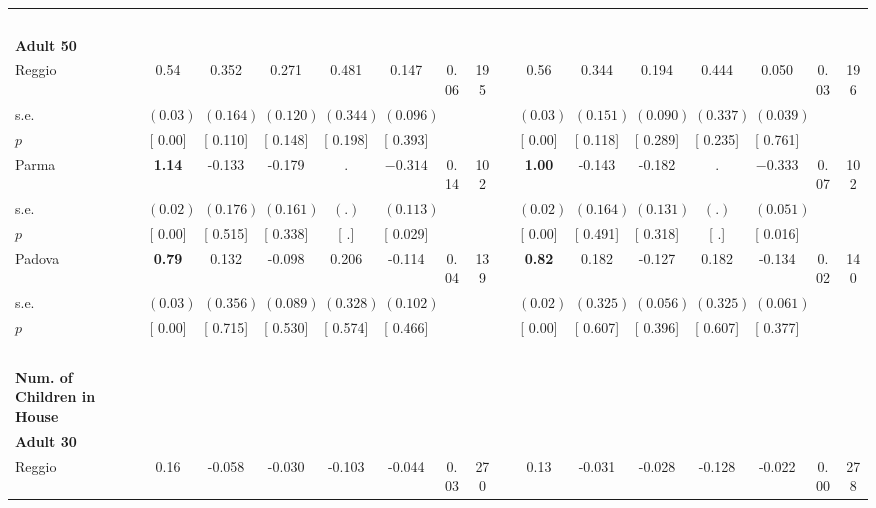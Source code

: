 \begin{longtable}{L{8em} c c c c c c c p{1em} c c c c c c c}
~\\[1em]
\quad \quad \textbf{Adult 50} & & & & & & & & & & & & & & & \\* 
\quad \quad \quad Reggio& 0.54 &     0.352 &     0.271 &     0.481 &     0.147 &      0.06 &       195 & & 0.56 &     0.344 &     0.194 &     0.444 &     0.050 &      0.03 &       196  \\*
\quad \quad \quad \quad s.e.& $ (     0.03)$ & $ (    0.164)$ & $ (    0.120)$ & $ (    0.344)$ & $ (    0.096)$ & & & & $ (     0.03)$ & $ (    0.151)$ & $ (    0.090)$ & $ (    0.337)$ & $ (    0.039)$ & &  \\*
\quad \quad \quad \quad $ p$ & [     0.00] & [    0.110] & [    0.148] & [    0.198] & [    0.393] & & & & [     0.00] & [    0.118] & [    0.289] & [    0.235] & [    0.761] & &  \\[1em]
\quad \quad \quad Parma& \textbf{     1.14} &    -0.133 &    -0.179 &         . & $ \mathbf{   -0.314}$ &      0.14 &       102 & & \textbf{     1.00} &    -0.143 &    -0.182 &         . & $ \mathbf{   -0.333}$ &      0.07 &       102  \\*
\quad \quad \quad \quad s.e.& $ (     0.02)$ & $ (    0.176)$ & $ (    0.161)$ & $ (        .)$ & $ (    0.113)$ & & & & $ (     0.02)$ & $ (    0.164)$ & $ (    0.131)$ & $ (        .)$ & $ (    0.051)$ & &  \\*
\quad \quad \quad \quad $ p$ & [     0.00] & [    0.515] & [    0.338] & [        .] & [    0.029] & & & & [     0.00] & [    0.491] & [    0.318] & [        .] & [    0.016] & &  \\[1em]
\quad \quad \quad Padova& \textbf{     0.79} &     0.132 &    -0.098 &     0.206 &    -0.114 &      0.04 &       139 & & \textbf{     0.82} &     0.182 &    -0.127 &     0.182 &    -0.134 &      0.02 &       140  \\*
\quad \quad \quad \quad s.e.& $ (     0.03)$ & $ (    0.356)$ & $ (    0.089)$ & $ (    0.328)$ & $ (    0.102)$ & & & & $ (     0.02)$ & $ (    0.325)$ & $ (    0.056)$ & $ (    0.325)$ & $ (    0.061)$ & &  \\*
\quad \quad \quad \quad $ p$ & [     0.00] & [    0.715] & [    0.530] & [    0.574] & [    0.466] & & & & [     0.00] & [    0.607] & [    0.396] & [    0.607] & [    0.377] & &  \\[1em]
~\\[1em]
\textbf{Num. of Children in House} \\*
\quad \quad \textbf{Adult 30} & & & & & & & & & & & & & & & \\* 
\quad \quad \quad Reggio& 0.16 &    -0.058 &    -0.030 &    -0.103 &    -0.044 &      0.03 &       270 & & 0.13 &    -0.031 &    -0.028 &    -0.128 &    -0.022 &      0.00 &       278  \\*

\end{longtable}
